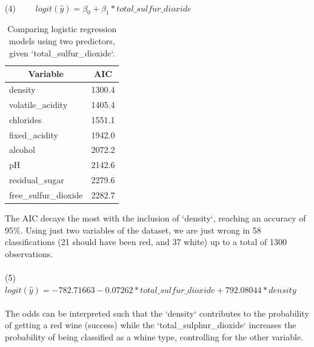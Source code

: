 \documentclass[10pt]{article}
\begin{document}
\paragraph*{}
(4) \ \ \ \ $logit(\hat{y}) = \beta_0 + \beta_1*total\_sulfur\_dioxide$

\begin{table}[H]
	\centering
	\begin{tabular}{|l|l|}
		\hline
		\multicolumn{1}{|c|}{\textbf{Variable}} & \multicolumn{1}{c|}{\textbf{AIC}} \\ \hline
		density                                 & 1300.4                            \\ \hline
		volatile\_acidity                       & 1405.4                            \\ \hline
		chlorides                               & 1551.1                            \\ \hline
		fixed\_acidity                          & 1942.0                            \\ \hline
		alcohol                                 & 2072.2                            \\ \hline
		pH                                      & 2142.6                            \\ \hline
		residual\_sugar                         & 2279.6                            \\ \hline
		free\_sulfur\_dioxide                   & 2282.7                            \\ \hline
	\end{tabular}
	\caption{Comparing logistic regression models using two predictors, given `total\_sulfur\_dioxide`.}
	\label{table:two-predictors}
\end{table}


The AIC decays the most with the inclusion of `density`, reaching an accuracy of 95\%. Using just two variables of the dataset, we are just wrong in 58 classifications (21 should have been red, and 37 white) up to a total of 1300 observations.

\paragraph*{}
(5) \ \ \ $logit(\hat{y}) = -782.71663  -0.07262*total\_sulfur\_dioxide +792.08044  *density$

\paragraph*{}
The odds can be interpreted such that the `density` contributes to the probability of getting a red wine (success) while the `total\_sulphur\_dioxide` increases the probability of being classified as a whine type, controlling for the other variable.
\end{document}
